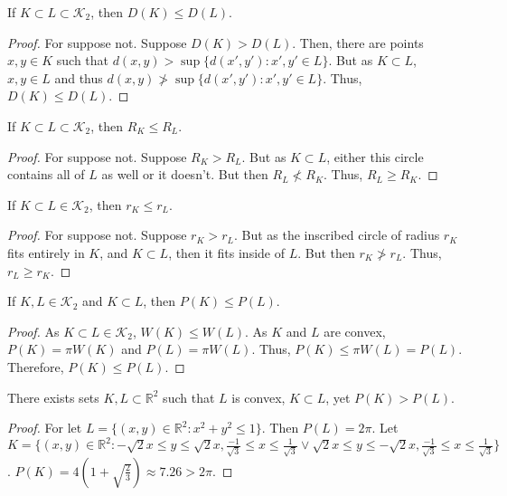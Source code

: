 \documentclass[crop=false,class=article,oneside]{standalone}
\begin{document}
        \begin{theorem}
        If $K\subset L\subset \mathscr{K}_2$, then $D(K)\leq D(L)$.
        \end{theorem}
        \begin{proof}
        For suppose not. Suppose $D(K)>D(L)$. Then, there are points $x,y\in K$ such that $d(x,y)> \sup\{d(x',y'):x',y'\in L\}$. But as $K\subset L$, $x,y\in L$ and thus $d(x,y) \not> \sup\{d(x',y'):x',y'\in L\}$. Thus, $D(K)\leq D(L)$.
        \end{proof}
        \begin{theorem}
        If $K\subset L \subset \mathscr{K}_2$, then $R_K\leq R_L$.
        \end{theorem}
        \begin{proof}
        For suppose not. Suppose $R_K>R_L$. But as $K\subset L$, either this circle contains all of $L$ as well or it doesn't. But then $R_L \not<R_K$. Thus, $R_L\geq R_K$.
        \end{proof}
        \begin{theorem}
        If $K\subset L \in \mathscr{K}_2$, then $r_K \leq r_L$.
        \end{theorem}
        \begin{proof}
        For suppose not. Suppose $r_K> r_L$. But as the inscribed circle of radius $r_K$ fits entirely in $K$, and $K\subset L$, then it fits inside of $L$. But then $r_K \not > r_L$. Thus, $r_L \geq r_K$.
        \end{proof}
        \begin{theorem}
        If $K,L\in \mathscr{K}_2$ and $K\subset L$, then $P(K)\leq P(L)$.
        \end{theorem}
        \begin{proof}
        As $K\subset L\in  \mathscr{K}_2$, $W(K)\leq W(L)$. As $K$ and $L$ are convex, $P(K)=\pi W(K)$ and $P(L)=\pi W(L)$. Thus, $P(K) \leq \pi W(L) = P(L)$. Therefore, $P(K)\leq P(L)$.
        \end{proof}
        \begin{theorem}
        There exists sets $K,L\subset \mathbb{R}^2$ such that $L$ is convex, $K\subset L$, yet $P(K)>P(L)$.
        \end{theorem}
        \begin{proof}
        For let $L = \{(x,y)\in \mathbb{R}^2: x^2 + y^2 \leq 1\}$. Then $P(L) = 2\pi$. Let $K = \{(x,y)\in \mathbb{R}^2: -\sqrt{2}x\leq y \leq \sqrt{2}x,\frac{-1}{\sqrt{3}} \leq x \leq \frac{1}{\sqrt{3}} \lor \sqrt{2}x\leq y \leq -\sqrt{2}x,\frac{-1}{\sqrt{3}} \leq x \leq \frac{1}{\sqrt{3}} \}$. $P(K) = 4(1+ \sqrt{\frac{2}{3}}) \approx 7.26>2\pi$.
        \end{proof}
\end{document}
